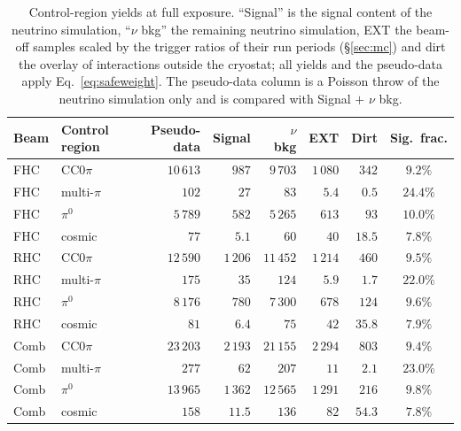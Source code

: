 \documentclass[11pt,a4paper]{article}
\begin{document}
\begin{table}[H]
  \centering
  \caption{Control-region yields at full exposure. ``Signal'' is the signal content of the
    neutrino simulation, ``$\nu$ bkg'' the remaining neutrino simulation, EXT the beam-off samples scaled
    by the trigger ratios of their run periods (\S\ref{sec:mc}) and dirt the overlay of interactions
    outside the cryostat; all yields and the pseudo-data apply Eq.~\eqref{eq:safeweight}. The
    pseudo-data column is a Poisson throw of the neutrino simulation only and is compared with
    Signal $+$ $\nu$ bkg.}
  \label{tab:sideband_yields}
  \small
  \begin{tabular}{llrrrrrc}
    \toprule
    Beam & Control region & Pseudo-data & Signal & $\nu$ bkg & EXT & Dirt & Sig.\ frac. \\
    \midrule
    FHC & CC$0\pi$ & $10\,613$ & $987$ & $9\,703$ & $1\,080$ & $342$ & $9.2\%$ \\
    FHC & multi-$\pi$ & $102$ & $27$ & $83$ & $5.4$ & $0.5$ & $24.4\%$ \\
    FHC & $\pi^0$ & $5\,789$ & $582$ & $5\,265$ & $613$ & $93$ & $10.0\%$ \\
    FHC & cosmic & $77$ & $5.1$ & $60$ & $40$ & $18.5$ & $7.8\%$ \\
    \midrule
    RHC & CC$0\pi$ & $12\,590$ & $1\,206$ & $11\,452$ & $1\,214$ & $460$ & $9.5\%$ \\
    RHC & multi-$\pi$ & $175$ & $35$ & $124$ & $5.9$ & $1.7$ & $22.0\%$ \\
    RHC & $\pi^0$ & $8\,176$ & $780$ & $7\,300$ & $678$ & $124$ & $9.6\%$ \\
    RHC & cosmic & $81$ & $6.4$ & $75$ & $42$ & $35.8$ & $7.9\%$ \\
    \midrule
    Comb & CC$0\pi$ & $23\,203$ & $2\,193$ & $21\,155$ & $2\,294$ & $803$ & $9.4\%$ \\
    Comb & multi-$\pi$ & $277$ & $62$ & $207$ & $11$ & $2.1$ & $23.0\%$ \\
    Comb & $\pi^0$ & $13\,965$ & $1\,362$ & $12\,565$ & $1\,291$ & $216$ & $9.8\%$ \\
    Comb & cosmic & $158$ & $11.5$ & $136$ & $82$ & $54.3$ & $7.8\%$ \\
    \bottomrule
  \end{tabular}
\end{table}
\end{document}

